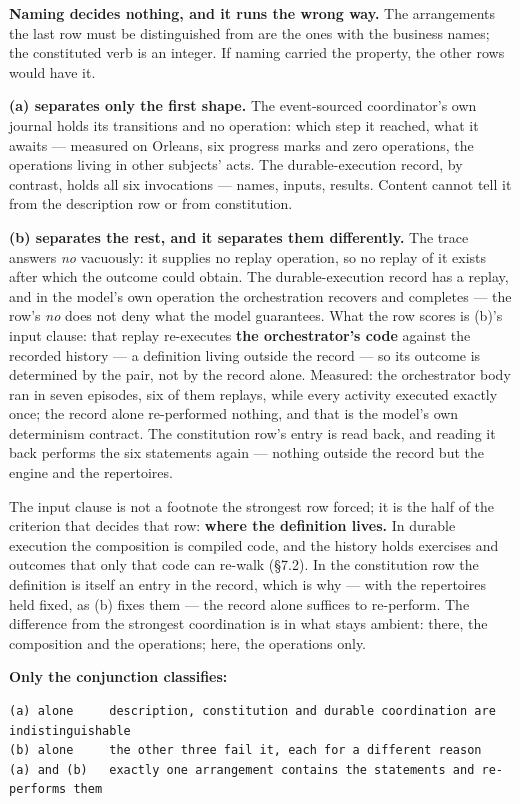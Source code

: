 \documentclass[
]{article}
\begin{document}
\textbf{Naming decides nothing, and it runs the wrong way.} The
arrangements the last row must be distinguished from are the ones with
the business names; the constituted verb is an integer. If naming
carried the property, the other rows would have it.

\textbf{(a) separates only the first shape.} The event-sourced
coordinator's own journal holds its transitions and no operation: which
step it reached, what it awaits --- measured on Orleans, six progress
marks and zero operations, the operations living in other subjects'
acts. The durable-execution record, by contrast, holds all six
invocations --- names, inputs, results. Content cannot tell it from the
description row or from constitution.

\textbf{(b) separates the rest, and it separates them differently.} The
trace answers \emph{no} vacuously: it supplies no replay operation, so
no replay of it exists after which the outcome could obtain. The
durable-execution record has a replay, and in the model's own operation
the orchestration recovers and completes --- the row's \emph{no} does
not deny what the model guarantees. What the row scores is (b)'s input
clause: that replay re-executes \textbf{the orchestrator's code} against
the recorded history --- a definition living outside the record --- so
its outcome is determined by the pair, not by the record alone.
Measured: the orchestrator body ran in seven episodes, six of them
replays, while every activity executed exactly once; the record alone
re-performed nothing, and that is the model's own determinism contract.
The constitution row's entry is read back, and reading it back performs
the six statements again --- nothing outside the record but the engine
and the repertoires.

The input clause is not a footnote the strongest row forced; it is the
half of the criterion that decides that row: \textbf{where the
definition lives.} In durable execution the composition is compiled
code, and the history holds exercises and outcomes that only that code
can re-walk (§7.2). In the constitution row the definition is itself an
entry in the record, which is why --- with the repertoires held fixed,
as (b) fixes them --- the record alone suffices to re-perform. The
difference from the strongest coordination is in what stays ambient:
there, the composition and the operations; here, the operations only.

\textbf{Only the conjunction classifies:}

\begin{verbatim}
(a) alone     description, constitution and durable coordination are indistinguishable
(b) alone     the other three fail it, each for a different reason
(a) and (b)   exactly one arrangement contains the statements and re-performs them
\end{verbatim}
\end{document}
